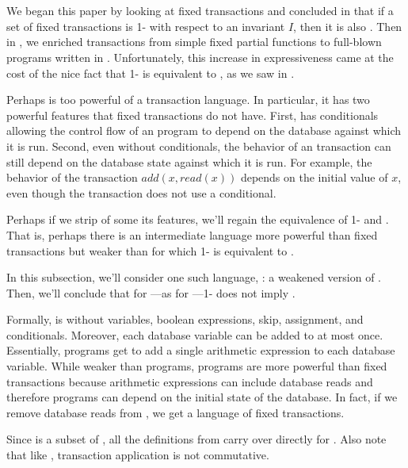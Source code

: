 \section{\wimp{}}\label{sec:wimp}
We began this paper by looking at fixed transactions and concluded in
 that if a set of fixed transactions is 1-\iconfluent{}
with respect to an invariant $I$, then it is also \iconfluent{}. Then in
, we enriched transactions from simple fixed partial functions
to full-blown programs written in \imp{}. Unfortunately, this increase in
expressiveness came at the cost of the nice fact that 1-\iconfluence{} is
equivalent to \iconfluence{}, as we saw in .

Perhaps \imp{} is too powerful of a transaction language. In particular, it has
two powerful features that fixed transactions do not have. First, \imp{} has
conditionals allowing the control flow of an \imp{} program to depend on the
database against which it is run. Second, even without conditionals, the
behavior of an \imp{} transaction can still depend on the database state
against which it is run. For example, the behavior of the transaction $add(x,
read(x))$ depends on the initial value of $x$, even though the transaction does
not use a conditional.

Perhaps if we strip \imp{} of some its features, we'll regain the equivalence
of 1-\iconfluence{} and \iconfluence{}. That is, perhaps there is an
intermediate language more powerful than fixed transactions but weaker than
\imp{} for which 1-\iconfluence{} is equivalent to \iconfluence{}.

In this subsection, we'll consider one such language, \wimp{}: a weakened
version of \imp{}. Then, we'll conclude that for \wimp{}---as for
\imp{}---1-\iconfluence{} does not imply \iconfluence{}.

Formally, \wimp{} is \imp{} without variables, boolean expressions, skip,
assignment, and conditionals. Moreover, each database variable can be added to
at most once. Essentially, \wimp{} programs get to add a single arithmetic
expression to each database variable. While weaker than \imp{} programs,
\wimp{} programs are more powerful than fixed transactions because arithmetic
expressions can include database reads and therefore \wimp{} programs can
depend on the initial state of the database. In fact, if we remove database
reads from \wimp{}, we get a language of fixed transactions.

Since \wimp{} is a subset of \imp{}, all the definitions from \imp{} carry over
directly for \wimp{}. Also note that like \imp{}, \wimp{} transaction
application is not commutative.

